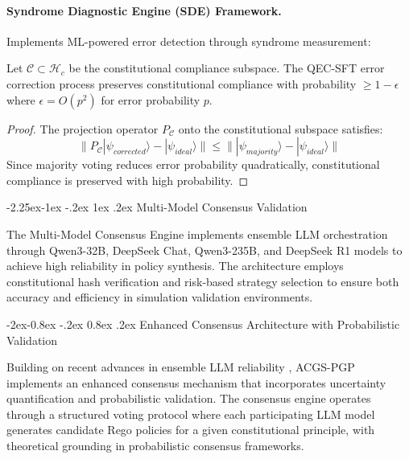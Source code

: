 \documentclass[manuscript,screen,9pt]{acmart}
\makeatletter
\renewcommand\subsection{\@startsection{subsection}{2}{\z@}%
  {-2.25ex\@plus -1ex \@minus -.2ex}%
  {1ex \@plus .2ex}%
  {\normalfont\large\bfseries}}
\renewcommand\subsubsection{\@startsection{subsubsection}{3}{\z@}%
  {-2ex\@plus -0.8ex \@minus -.2ex}%
  {0.8ex \@plus .2ex}%
  {\normalfont\normalsize\bfseries}}
\makeatother
\begin{document}
\paragraph{Syndrome Diagnostic Engine (SDE) Framework.} Implements ML-powered error detection through syndrome measurement:

\begin{theorem}
	Let $\mathcal{C} \subset \mathcal{H}_c$ be the constitutional compliance subspace. The QEC-SFT error correction process preserves constitutional compliance with probability $\geq 1 - \epsilon$ where $\epsilon = O(p^2)$ for error probability $p$.
\end{theorem}

\begin{proof}
	The projection operator $P_{\mathcal{C}}$ onto the constitutional subspace satisfies:
	$$\|P_{\mathcal{C}}|\psi_{corrected}\rangle - |\psi_{ideal}\rangle\| \leq \||\psi_{majority}\rangle - |\psi_{ideal}\rangle\|$$
	Since majority voting reduces error probability quadratically, constitutional compliance is preserved with high probability.
\end{proof}

\subsection{Multi-Model Consensus Validation}
\label{subsec:multi_model_consensus}

The Multi-Model Consensus Engine implements ensemble LLM orchestration through Qwen3-32B, DeepSeek Chat, Qwen3-235B, and DeepSeek R1 models to achieve high reliability in policy synthesis. The architecture employs constitutional hash verification and risk-based strategy selection to ensure both accuracy and efficiency in simulation validation environments.

\subsubsection{Enhanced Consensus Architecture with Probabilistic Validation}
\label{subsubsec:enhanced_consensus}

Building on recent advances in ensemble LLM reliability \citep{Naik2024ProbabilisticConsensus}, ACGS-PGP implements an enhanced consensus mechanism that incorporates uncertainty quantification and probabilistic validation. The consensus engine operates through a structured voting protocol where each participating LLM model generates candidate Rego policies for a given constitutional principle, with theoretical grounding in probabilistic consensus frameworks.
\end{document}
